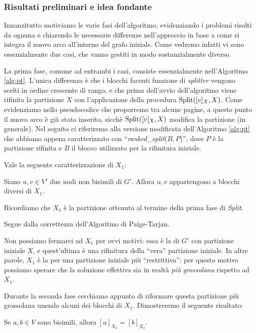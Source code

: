 \subsubsection{Risultati preliminari e idea fondante}
Innanzitutto motiviamo le varie fasi dell'algoritmo, evidenziando i problemi risolti da ognuna e chiarendo le necessarie differenze nell'approccio in base a come si integra il nuovo arco all'interno del grafo iniziale. Come vedremo infatti vi sono essenzialmente due casi, che vanno gestiti in modo sostanzialmente diverso.

La prima fase, comune ad entrambi i casi, consiste essenzialmente nell'Algoritmo \ref{alg:pt}. L'unica differenza è che i blocchi facenti funzione di \emph{splitter} vengono scelti in ordine crescente di rango, e che prima dell'avvio dell'algoritmo viene rifinita la partizione $X$ con l'applicazione della procedura $\textup{Split}([v]_X, X)$. Come evidenziamo nello pseudocodice che proporremo tra alcune pagine, a questo punto il nuovo arco è già stato inserito, sicchè $\textup{Split}([v]_X, X)$ modifica la partizione (in generale). Nel seguito ci riferiremo alla versione modificata dell'Algoritmo \ref{alg:pt} che abbiamo appena caratterizzato con ``\emph{ranked\_split}($B,P$)'', dove $P$ è la partizione rifinita e $B$ il blocco utilizzato per la rifinitura iniziale.

Vale la seguente caratterizzazione di $X_1$:

\begin{proposition}
    \label{prop:x1_prop}
    Siano $u,v \in V'$ due nodi non bisimili di $G'$. Allora $u,v$ appartengono a blocchi diversi di $X_1$.
\end{proposition}
Ricordiamo che $X_1$ è la partizione ottenuta al termine della prima fase di \emph{Split}.
\begin{proof2}
    Segue dalla correttezza dell'Algoritmo di Paige-Tarjan.
\end{proof2}

Non possiamo fermarci ad $X_1$ per ovvi motivi: essa è la \rscpnomath di $G'$ con partizione iniziale $X$, e quest'ultima è una rifinitura della ``vera'' partizione iniziale. In altre parole, $X_1$ è la \rscpnomath per una partizione iniziale più ``restrittiva'': per questo motivo possiamo sperare che la soluzione effettiva sia in realtà \emph{più grossolana} rispetto ad $X_1$.

Durante la seconda fase cerchiamo appunto di riformare questa partizione più grossolana unendo alcuni dei blocchi di $X_1$. Dimostreremo il seguente risultato:
\begin{proposition}
    \label{prop:saha_after_second_phase}
    Se $a,b \in V$ sono bisimili, allora $[a]_{X_2} = [b]_{X_2}$.
\end{proposition}

